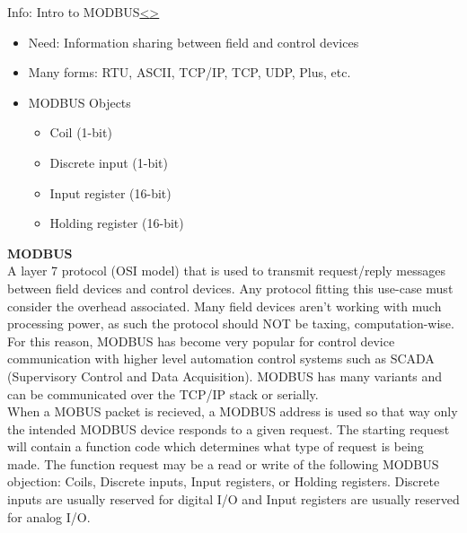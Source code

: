 \documentclass[12pt]{extarticle}
\newenvironment{instructionblock}{\Large\bgroup}{\egroup}
\newcommand{\bi}{\begin{itemize}}
\newcommand{\ei}{\end{itemize}}
\newcounter{next}
\newcounter{prev}
\begin{document}
\pagebreak
{}
\begin{slide}{Info: Intro to MODBUS}{\hyperref[slide \theprev]{\textless}\hyperref[slide \thenext]{\textgreater}}
\begin{instructionblock}
\bi 
	\item Need: Information sharing between field and control devices
	\item Many forms: RTU, ASCII, TCP/IP, TCP, UDP, Plus, etc.
	\item MODBUS Objects
	\bi
		\item Coil (1-bit)
		\item Discrete input (1-bit)
		\item Input register (16-bit)
		\item Holding register (16-bit)
	\ei
\ei
\end{instructionblock}
\end{slide}
\vfill
\noindent
\textbf{MODBUS}\\
A layer 7 protocol (OSI model) that is used to transmit request/reply messages between field devices and control devices. Any protocol fitting this use-case must consider the overhead associated. Many field devices aren't working with much processing power, as such the protocol should NOT be taxing, computation-wise. For this reason, MODBUS has become very popular for control device communication with higher level automation control systems such as SCADA (Supervisory Control and Data Acquisition). MODBUS has many variants and can be communicated over the TCP/IP stack or serially. \cite[p. 123]{KnappLangill}\\
When a MOBUS packet is recieved, a MODBUS address is used so that way only the intended MODBUS device responds to a given request. The starting request will contain a function code which determines what type of request is being made. The function request may be a read or write of the following MODBUS objection: Coils, Discrete inputs, Input registers, or Holding registers. Discrete inputs are usually reserved for digital I/O and Input registers are usually reserved for analog I/O. \cite[p.123-125]{KnappLangill}\\
\pagebreak
{}
\end{document}
